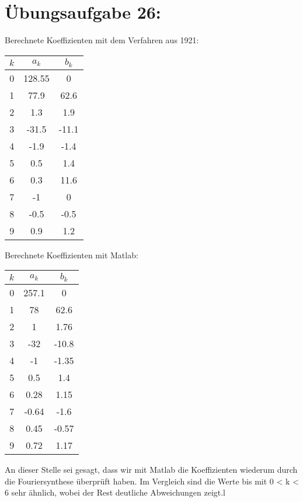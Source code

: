 

	\section*{Übungsaufgabe 26:}
	Berechnete Koeffizienten mit dem Verfahren aus 1921:\newline
	\begin{center}
		\begin{tabular}{|c|c|c|}
			\hline 
			$k$ & $a_k$ & $b_k$ \\
			\hline
			0   &  128.55    & 0 \\
			1   &  77.9    & 62.6 \\
			2   &  1.3    & 1.9 \\
			3   &  -31.5    & -11.1 \\
			4   &  -1.9    & -1.4 \\
			5   &  0.5    & 1.4 \\
			6   &  0.3    & 11.6 \\
			7   &  -1    & 0 \\
			8   &  -0.5    & -0.5 \\
			9   &  0.9    & 1.2 \\
			\hline
		\end{tabular}
	\end{center}
	Berechnete Koeffizienten mit Matlab:
	\begin{center}
		\begin{tabular}{|c|c|c|}
			\hline 
			$k$ & $a_k$ & $b_k$ \\
			\hline
			0   &  257.1    & 0 \\
			1   &  78    & 62.6 \\
			2   &  1    & 1.76 \\
			3   &  -32    & -10.8 \\
			4   &  -1    & -1.35 \\
			5   &  0.5    & 1.4 \\
			6   &  0.28    & 1.15 \\
			7   &  -0.64    & -1.6 \\
			8   &  0.45    & -0.57 \\
			9   &  0.72    & 1.17 \\
			\hline
		\end{tabular}
	\end{center}
	An dieser Stelle sei gesagt, dass wir mit Matlab die Koeffizienten wiederum durch die Fouriersynthese überprüft haben.
	Im Vergleich sind die Werte bis mit 0 < k < 6 sehr ähnlich, wobei der Rest deutliche Abweichungen zeigt.l
	
